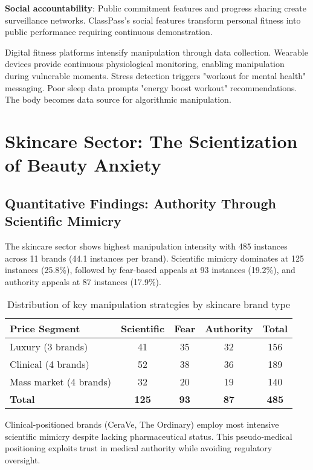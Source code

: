 \textbf{Social accountability}: Public commitment features and progress sharing create surveillance networks. ClassPass's social features transform personal fitness into public performance requiring continuous demonstration.

Digital fitness platforms intensify manipulation through data collection. Wearable devices provide continuous physiological monitoring, enabling manipulation during vulnerable moments. Stress detection triggers "workout for mental health" messaging. Poor sleep data prompts "energy boost workout" recommendations. The body becomes data source for algorithmic manipulation.

\section{Skincare Sector: The Scientization of Beauty Anxiety}
\label{sec:skincare_analysis}

\subsection{Quantitative Findings: Authority Through Scientific Mimicry}

The skincare sector shows highest manipulation intensity with 485 instances across 11 brands (44.1 instances per brand). Scientific mimicry dominates at 125 instances (25.8\%), followed by fear-based appeals at 93 instances (19.2\%), and authority appeals at 87 instances (17.9\%).

\begin{table}[h]
\centering
\begin{tabular}{|l|c|c|c|c|}
\hline
\textbf{Price Segment} & \textbf{Scientific} & \textbf{Fear} & \textbf{Authority} & \textbf{Total} \\
\hline
Luxury (3 brands) & 41 & 35 & 32 & 156 \\
Clinical (4 brands) & 52 & 38 & 36 & 189 \\
Mass market (4 brands) & 32 & 20 & 19 & 140 \\
\hline
\textbf{Total} & \textbf{125} & \textbf{93} & \textbf{87} & \textbf{485} \\
\hline
\end{tabular}
\caption{Distribution of key manipulation strategies by skincare brand type}
\end{table}

Clinical-positioned brands (CeraVe, The Ordinary) employ most intensive scientific mimicry despite lacking pharmaceutical status. This pseudo-medical positioning exploits trust in medical authority while avoiding regulatory oversight.

